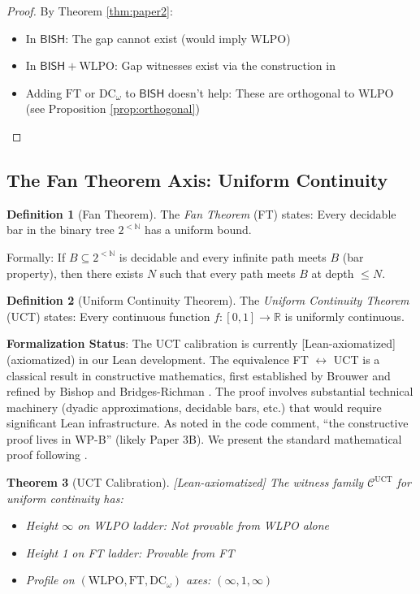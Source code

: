 \documentclass[11pt]{article}
\theoremstyle{plain}
\newtheorem{theorem}{Theorem}[section]
\theoremstyle{definition}
\newtheorem{definition}[theorem]{Definition}
\newcommand{\N}{\mathbb{N}}
\newcommand{\R}{\mathbb{R}}
\newcommand{\WLPO}{\mathrm{WLPO}}
\newcommand{\FT}{\mathrm{FT}}
\newcommand{\DCw}{\mathrm{DC}_\omega}
\newcommand{\UCT}{\mathrm{UCT}}
\newcommand{\BISH}{\mathsf{BISH}}
\newcommand{\leanaxiom}{\textsf{\textcolor{orange!80!black}{[Lean-axiomatized]}}}
\begin{document}
\begin{proof}
By Theorem \ref{thm:paper2}:
\begin{itemize}
\item In $\BISH$: The gap cannot exist (would imply WLPO)
\item In $\BISH + \WLPO$: Gap witnesses exist via the construction in \cite{Paper2}
\item Adding $\FT$ or $\DCw$ to $\BISH$ doesn't help: These are orthogonal to WLPO (see Proposition \ref{prop:orthogonal})
\end{itemize}
\end{proof}

\subsection{The Fan Theorem Axis: Uniform Continuity}

\begin{definition}[Fan Theorem]\label{def:ft}
The \emph{Fan Theorem} (FT) states: Every decidable bar in the binary tree $2^{<\N}$ has a uniform bound.

Formally: If $B \subseteq 2^{<\N}$ is decidable and every infinite path meets $B$ (bar property), then there exists $N$ such that every path meets $B$ at depth $\leq N$.
\end{definition}

\begin{definition}[Uniform Continuity Theorem]\label{def:uct}
The \emph{Uniform Continuity Theorem} (UCT) states: Every continuous function $f: [0,1] \to \R$ is uniformly continuous.
\end{definition}

\begin{warningbox}
\textbf{Formalization Status}: The UCT calibration is currently \leanaxiom{} (axiomatized) in our Lean development. The equivalence FT $\leftrightarrow$ UCT is a classical result in constructive mathematics, first established by Brouwer and refined by Bishop \cite{Bishop1967} and Bridges-Richman \cite{BridgesRichman1987}. The proof involves substantial technical machinery (dyadic approximations, decidable bars, etc.) that would require significant Lean infrastructure. As noted in the code comment, ``the constructive proof lives in WP-B'' (likely Paper 3B). We present the standard mathematical proof following \cite{BridgesVita2006}.
\end{warningbox}

\begin{theorem}[UCT Calibration]\label{thm:uct-calib} \leanaxiom
The witness family $\mathcal{C}^{\UCT}$ for uniform continuity has:
\begin{itemize}
\item Height $\infty$ on WLPO ladder: Not provable from WLPO alone
\item Height 1 on FT ladder: Provable from FT
\item Profile on $(\WLPO, \FT, \DCw)$ axes: $(\infty, 1, \infty)$
\end{itemize}
\end{theorem}
\end{document}
